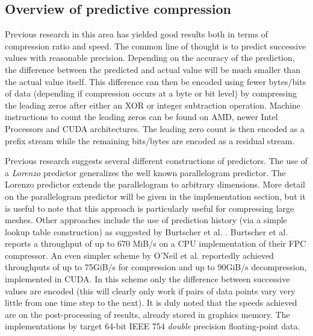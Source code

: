 \subsection{Overview of predictive compression}
Previous research \cite{1607248,4589203,engelson2000lossless,lindstrom2006fast,O'Neil:2011:FDC:1964179.1964189,4976448,CGF:CGF681} in this area has yielded good results both in terms of compression ratio and speed. 
The common line of thought is to predict successive values with reasonable precision. Depending on the accuracy of the prediction, the difference between the predicted and actual value will be much smaller than the actual value itself. 
This difference can then be encoded using fewer bytes/bits of data (depending if compression occurs at a byte or bit level) by compressing the leading zeros after either an XOR or integer subtraction 
operation. Machine instructions to count the leading zeros can be found on AMD, newer Intel Processors and CUDA architectures. The leading zero count is then encoded as a prefix stream while the remaining bits/bytes 
are encoded as a residual stream.

Previous research suggests several different constructions of predictors. The use of a \textit{Lorenzo} predictor \cite{lindstrom2006fast,CGF:CGF681} generalizes the well known parallelogram predictor. 
The Lorenzo predictor extends the parallelogram to arbitrary dimensions. More detail on the parallelogram predictor will be given
in the implementation section, but it is useful to note that this approach is particularly useful for compressing large meshes. Other approaches include the use of prediction history 
(via a simple lookup table construction) as suggested by Burtscher et al. \cite{1607248,4589203,4976448}. Burtscher et al. reports a throughput of up to 670 MiB/s on a CPU implementation of their FPC 
compressor. An even simpler scheme by O'Neil et al. \cite{O'Neil:2011:FDC:1964179.1964189} reportedly achieved throughputs of up to 75GiB/s for compression and up to 90GiB/s 
decompression, implemented in CUDA. In this scheme only the difference between successive values are encoded (this will clearly only work if pairs of data points 
vary very little from one time step to the next). It is duly noted that the speeds achieved  are on the post-processing of results, already stored in graphics memory. 
The implementations by \cite{O'Neil:2011:FDC:1964179.1964189,1607248,4589203,4976448,engelson2000lossless} target 64-bit IEEE 754 
\textit{double} precision floating-point data.

